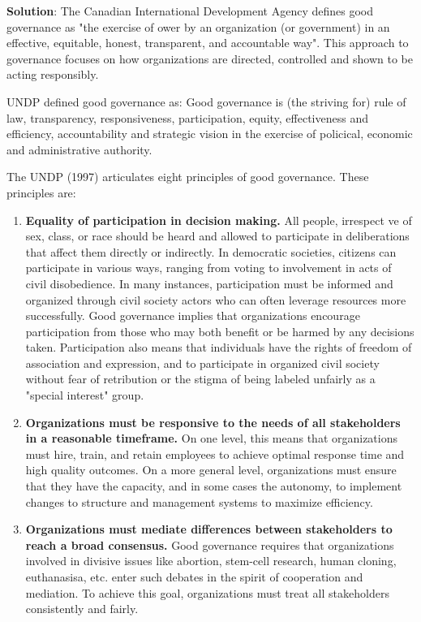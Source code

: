 \documentclass[
]{book}
\newenvironment{solution}{ {\bfseries Solution}:}{}
\begin{document}
\begin{questions}
\begin{solution}
The Canadian International Development Agency defines good governance as "the exercise of ower by an organization (or government) in an effective, equitable, honest, transparent, and accountable way". This approach to governance focuses on how organizations are directed, controlled and shown to be acting responsibly.

UNDP defined good governance as: Good governance is (the striving for) rule of law, transparency, responsiveness, participation, equity, effectiveness and efficiency, accountability and strategic vision in the exercise of policical, economic and administrative authority.

The UNDP (1997) articulates eight principles of good governance. These principles are:

\begin{enumerate}
\item \textbf{Equality of participation in decision making.} All people, irrespect ve of sex, class, or race should be heard and allowed to participate in deliberations that affect them directly or indirectly. In democratic societies, citizens can participate in various ways, ranging from voting to involvement in acts of civil disobedience. In many instances, participation must be informed and organized through civil society actors who can often leverage resources more successfully. Good governance implies that organizations encourage participation from those who may both benefit or be harmed by any decisions taken. Participation also means that individuals have the rights of freedom of association and expression, and to participate in organized civil society without fear of retribution or the stigma of being labeled unfairly as a "special interest" group.
\item \textbf{Organizations must be responsive to the needs of all stakeholders in a reasonable timeframe.} On one level, this means that organizations must hire, train, and retain employees to achieve optimal response time and high quality outcomes. On a more general level, organizations must ensure that they have the capacity, and in some cases the autonomy, to implement changes to structure and management systems to maximize efficiency.
\item \textbf{Organizations must mediate differences between stakeholders to reach a broad consensus.} Good governance requires that organizations involved in divisive issues like abortion, stem-cell research, human cloning, euthanasisa, etc. enter such debates in the spirit of cooperation and mediation. To achieve this goal, organizations must treat all stakeholders consistently and fairly.

\end{enumerate}
\end{solution}
\end{questions}
\end{document}

